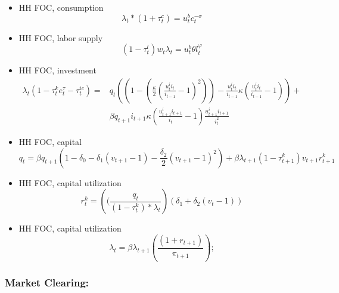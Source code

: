\documentclass[article,11pt,letterpaper,fleqn]{article}
\theoremstyle{definition}
\numberwithin{equation}{section}
\begin{document}
\begin{itemize}
\item HH FOC, consumption
\begin{equation}
\label{HH_FOC_cons}
\lambda_{t}*(1+\tau^{c}_{t}) = u^{b}_{t}c^{-\sigma}_{t} 
\end{equation}

\item HH FOC, labor supply
\begin{equation}
\label{HH_FOC_lab}
(1-\tau^{l}_{t})w_{t}\lambda_{t} = u^{b}_{t}\theta l^{\varphi}_{t} 
\end{equation}

\item HH FOC, investment
\begin{equation}
\label{HH_FOC_inv}
\begin{split}
\lambda_{t}(1-\tau^{k}_{t}e^{\tau}_{t}-\tau^{ic}_{t}) = & q_{t}\left(\left(1-\left(\frac{\kappa}{2}\left(\frac{u^{i}_{t}i_{t}}{i_{t-1}}-1\right)^{2}\right)\right) - \frac{u^{i}_{t}i_{t}}{i_{t-1}}\kappa\left(\frac{u^{i}_{t}i_{t}}{i_{t-1}}-1\right)\right) + \\
 &  \beta q_{t+1}i_{t+1}\kappa\left(\frac{u^{i}_{t+1}i_{t+1}}{i_{t}}-1\right)\frac{u^{i}_{t+1}i_{t+1}}{i^{2}_{t}}
\end{split}
\end{equation}

\item HH FOC, capital
\begin{equation}
\label{HH_FOC_cap}
q_{t} = \beta q_{t+1}\left(1-\delta_{0}-\delta_{1}(v_{t+1}-1)-\frac{\delta_{2}}{2}(v_{t+1}-1)^{2}\right) + \beta\lambda_{t+1}(1-\tau^{k}_{t+1})v_{t+1}r^{k}_{t+1} 
\end{equation}

\item HH FOC, capital utilization
\begin{equation}
\label{HH_FOC_util}
r^{k}_{t} = \left((\frac{q_{t}}{(1-\tau^{k}_{t})*\lambda_{t}}\right)\left(\delta_{1} + \delta_{2}(v_{t}-1)\right)
\end{equation}

\item HH FOC, capital utilization
\begin{equation}
\label{HH_FOC_bond}
\lambda_{t} = \beta\lambda_{t+1}\left(\frac{(1+r_{t+1})}{\pi_{t+1}}\right) ;
\end{equation}

\end{itemize}


\subsubsection{Market Clearing:}
\end{document}
